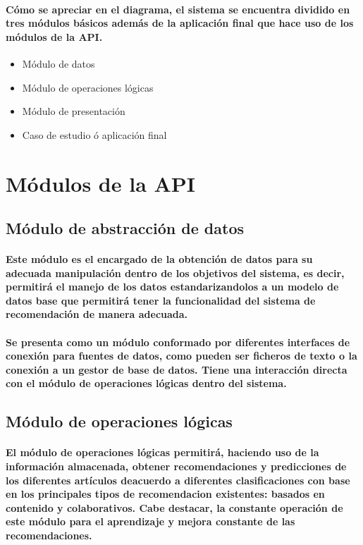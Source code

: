 \paragraph{Cómo se apreciar en el diagrama, el sistema se encuentra dividido en tres módulos básicos además de la aplicación final que hace uso de los módulos de la API.}
    \begin{itemize}
    \item Módulo de datos
    \item Módulo de operaciones lógicas
    \item Módulo de presentación
    \item Caso de estudio ó aplicación final
  \end{itemize}

\section{Módulos de la API}
  \subsection{Módulo de abstracción de datos}
    \paragraph{Este módulo es el encargado de la obtención de datos para su adecuada manipulación dentro de los objetivos del sistema, es decir, permitirá el manejo de los datos estandarizandolos a un modelo de datos base que permitirá tener la funcionalidad del sistema de recomendación de manera adecuada. }
    \paragraph{Se presenta como un módulo conformado por diferentes interfaces de conexión para fuentes de datos, como pueden ser ficheros de texto o la conexión a un gestor de base de datos. Tiene una interacción directa con el módulo de operaciones lógicas dentro del sistema.}

  \subsection{Módulo de operaciones lógicas}
    \paragraph{El módulo de operaciones lógicas permitirá, haciendo uso de la información almacenada, obtener recomendaciones y predicciones de los diferentes artículos deacuerdo a diferentes clasificaciones con base en los principales tipos de recomendacion existentes: basados en contenido y colaborativos. Cabe destacar, la constante operación de este módulo para el aprendizaje y mejora constante de las recomendaciones.}

